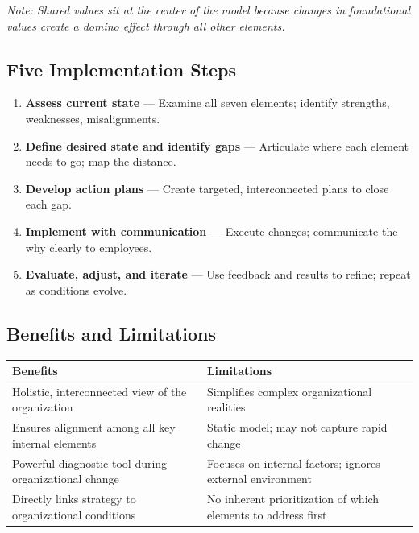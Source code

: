 \documentclass[11pt, letterpaper]{article}
\begin{document}
\textit{Note: Shared values sit at the center of the model because changes in foundational values create a domino effect through all other elements.}

\subsection{Five Implementation Steps}

\begin{enumerate}[leftmargin=*, label=\textbf{Step \arabic*.}]
  \item \textbf{Assess current state} --- Examine all seven elements; identify strengths, weaknesses, misalignments.
  \item \textbf{Define desired state and identify gaps} --- Articulate where each element needs to go; map the distance.
  \item \textbf{Develop action plans} --- Create targeted, interconnected plans to close each gap.
  \item \textbf{Implement with communication} --- Execute changes; communicate the why clearly to employees.
  \item \textbf{Evaluate, adjust, and iterate} --- Use feedback and results to refine; repeat as conditions evolve.
\end{enumerate}

\subsection{Benefits and Limitations}

\begin{center}
\begin{tabular}{p{6.5cm} p{6.5cm}}
\toprule
\textbf{Benefits} & \textbf{Limitations} \\
\midrule
Holistic, interconnected view of the organization & Simplifies complex organizational realities \\
Ensures alignment among all key internal elements & Static model; may not capture rapid change \\
Powerful diagnostic tool during organizational change & Focuses on internal factors; ignores external environment \\
Directly links strategy to organizational conditions & No inherent prioritization of which elements to address first \\
\bottomrule
\end{tabular}
\end{center}
\end{document}
